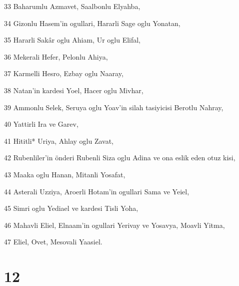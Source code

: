 \par 33 Baharumlu Azmavet, Saalbonlu Elyahba,
\par 34 Gizonlu Hasem'in ogullari, Hararli Sage oglu Yonatan,
\par 35 Hararli Sakâr oglu Ahiam, Ur oglu Elifal,
\par 36 Mekerali Hefer, Pelonlu Ahiya,
\par 37 Karmelli Hesro, Ezbay oglu Naaray,
\par 38 Natan'in kardesi Yoel, Hacer oglu Mivhar,
\par 39 Ammonlu Selek, Seruya oglu Yoav'in silah tasiyicisi Berotlu Nahray,
\par 40 Yattirli Ira ve Garev,
\par 41 Hititli* Uriya, Ahlay oglu Zavat,
\par 42 Rubenliler'in önderi Rubenli Siza oglu Adina ve ona eslik eden otuz kisi,
\par 43 Maaka oglu Hanan, Mitanli Yosafat,
\par 44 Asterali Uzziya, Aroerli Hotam'in ogullari Sama ve Yeiel,
\par 45 Simri oglu Yediael ve kardesi Tisli Yoha,
\par 46 Mahavli Eliel, Elnaam'in ogullari Yerivay ve Yosavya, Moavli Yitma,
\par 47 Eliel, Ovet, Mesovali Yaasiel.

\chapter{12}


